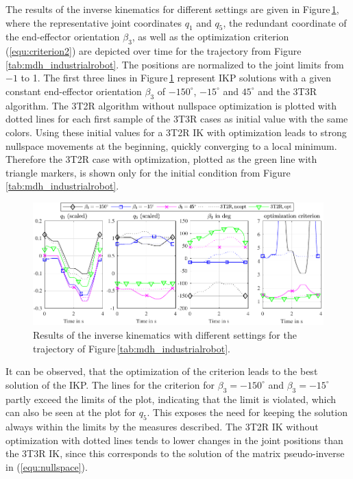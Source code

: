 \documentclass[robotics,article,accept,moreauthors,pdftex]{Definitions/mdpi}
\begin{document}
The results of the inverse kinematics for different settings are given in Figure\,\ref{fig:serrob_traj_3T2R}, where the representative joint coordinates $q_1$ and $q_5$, the redundant coordinate of the end-effector orientation $\beta_3$, as well as the optimization criterion (\ref{equ:criterion2}) are depicted over time for the trajectory from Figure\,\ref{tab:mdh_industrialrobot}.
The positions are normalized to the joint limits from  $-1 $ to 1.
The first three lines in Figure\,\ref{fig:serrob_traj_3T2R} represent IKP solutions with a given constant end-effector orientation $\beta_3$ of $-150^\circ$, $-15^\circ$ and $45^\circ$ and the 3T3R algorithm.
The 3T2R algorithm without nullspace optimization is plotted with dotted lines for each first sample of the 3T3R cases as initial value with the same colors.
Using these initial values for a 3T2R IK with optimization leads to strong nullspace movements at the beginning, quickly converging to a local minimum.
Therefore\added[id=Sp]{,} the 3T2R case with optimization, plotted as the green line with triangle markers, is shown only for the initial condition from Figure\,\ref{tab:mdh_industrialrobot}.
%
\begin{figure}[b]
	\includegraphics{serrob_traj_nullspace_optim.pdf}
	\caption{Results of the inverse kinematics with different settings for the trajectory of Figure\,\ref{tab:mdh_industrialrobot}.}
	\label{fig:serrob_traj_3T2R}
\end{figure}
%
It can be observed, that the optimization of the criterion leads to the best solution of the IKP.
The lines for the criterion for $\beta_3=-150^\circ$ and $\beta_3=-15^\circ$ partly exceed the limits of the plot, indicating that the limit is violated, which can also be seen at the plot for $q_5$.
This exposes the need for keeping the solution always within the limits by the measures described.
The 3T2R IK without optimization with dotted lines tends to lower changes in the joint positions than the 3T3R IK, since this corresponds to the solution of the matrix \linebreak pseudo-inverse in (\ref{equ:nullspace}).
\end{document}
